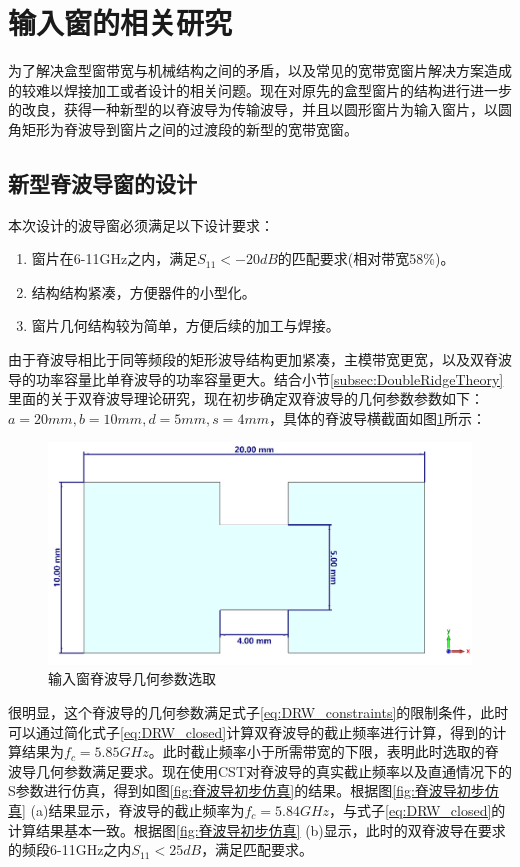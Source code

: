 \documentclass[master]{thesis-uestc}
\begin{document}
\section{输入窗的相关研究}
为了解决盒型窗带宽与机械结构之间的矛盾，以及常见的宽带宽窗片解决方案造成的较难以焊接加工或者设计的相关问题。现在对原先的盒型窗片的结构进行进一步的改良，获得一种新型的以脊波导为传输波导，并且以圆形窗片为输入窗片，以圆角矩形为脊波导到窗片之间的过渡段的新型的宽带宽窗。
\subsection{新型脊波导窗的设计}
本次设计的波导窗必须满足以下设计要求：
\begin{enumerate}
    \item 窗片在6-11GHz之内，满足$S_{11}<-20dB$的匹配要求(相对带宽58\%)。
    \item 结构结构紧凑，方便器件的小型化。
    \item 窗片几何结构较为简单，方便后续的加工与焊接。
\end{enumerate}

由于脊波导相比于同等频段的矩形波导结构更加紧凑，主模带宽更宽，以及双脊波导的功率容量比单脊波导的功率容量更大。结合小节\ref{subsec:DoubleRidgeTheory}里面的关于双脊波导理论研究，现在初步确定双脊波导的几何参数参数如下：$a=20mm, b=10mm, d=5mm, s=4mm $，具体的脊波导横截面如图\ref{fig:6-11GHzDRW}所示：
\begin{figure}[!htb]\label{fig:6-11GHzDRW}
    \includegraphics[width=0.7\linewidth]{pic/chapter3/6-11GHzDRW.png}
    \caption[short catption 1]{输入窗脊波导几何参数选取}
\end{figure}

很明显，这个脊波导的几何参数满足式子\ref{eq:DRW_constraints}的限制条件，此时可以通过简化式子\ref{eq:DRW_closed}计算双脊波导的截止频率进行计算，得到的计算结果为$f_c=5.85GHz$。此时截止频率小于所需带宽的下限，表明此时选取的脊波导几何参数满足要求。现在使用CST对脊波导的真实截止频率以及直通情况下的S参数进行仿真，得到如图\ref{fig:脊波导初步仿真}的结果。根据图\ref{fig:脊波导初步仿真} (a)结果显示，脊波导的截止频率为$f_c=5.84GHz$，与式子\ref{eq:DRW_closed}的计算结果基本一致。根据图\ref{fig:脊波导初步仿真} (b)显示，此时的双脊波导在要求的频段6-11GHz之内$S_{11}<25dB$，满足匹配要求。
\end{document}
